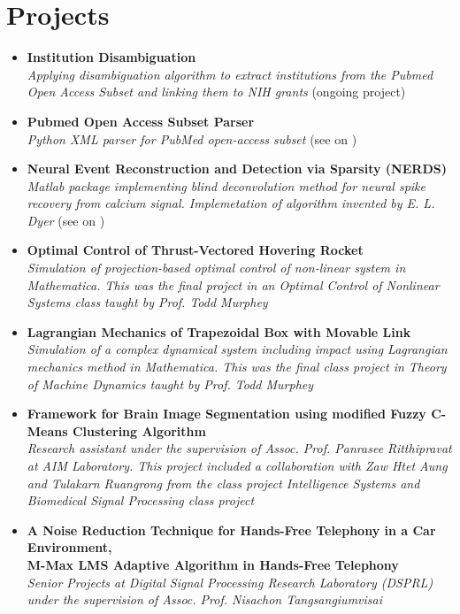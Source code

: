 \section{\sc Projects}
\begin{itemize}[leftmargin=0cm, label={}]

\item {\bf Institution Disambiguation} \\
{\em Applying disambiguation algorithm to extract institutions from the Pubmed Open Access Subset and linking them to NIH grants} (ongoing project)

\item {\bf Pubmed Open Access Subset Parser} \\
{\em Python XML parser for PubMed open-access subset} (see on \href{https://github.com/titipata/pubmed_parser}{\faGithubAlt})

\item {\bf Neural Event Reconstruction and Detection via Sparsity (NERDS)} \\
{\em Matlab package implementing blind deconvolution method for neural spike recovery from calcium signal. Implemetation of algorithm invented by E. L. Dyer} (see on \href{https://github.com/KordingLab/nerds}{\faGithubAlt})

\item {\bf Optimal Control of Thrust-Vectored Hovering Rocket}\\
{\em Simulation of projection-based optimal control of non-linear system in Mathematica. This was the final project in an  Optimal Control of Nonlinear Systems class taught by Prof. Todd Murphey}

\item {\bf Lagrangian Mechanics of Trapezoidal Box with Movable Link}\\
{\em Simulation of a complex dynamical system including impact using Lagrangian mechanics method in Mathematica. This was the final class project in Theory of Machine Dynamics taught by Prof. Todd Murphey }

\item {\bf Framework for Brain Image Segmentation using modified Fuzzy C-Means Clustering Algorithm}\\
{\em Research assistant under the supervision of Assoc. Prof. Panrasee Ritthipravat at AIM Laboratory. This project included a collaboration with Zaw Htet Aung and Tulakarn Ruangrong from the class project Intelligence Systems and Biomedical Signal Processing class project}

\item {\bf A Noise Reduction Technique for Hands-Free Telephony in a Car Environment, } \\
{\bf M-Max LMS Adaptive Algorithm in Hands-Free Telephony}\\
{\em Senior Projects at Digital Signal Processing Research Laboratory (DSPRL) under the supervision of Assoc. Prof. Nisachon Tangsangiumvisai}

\end{itemize}
